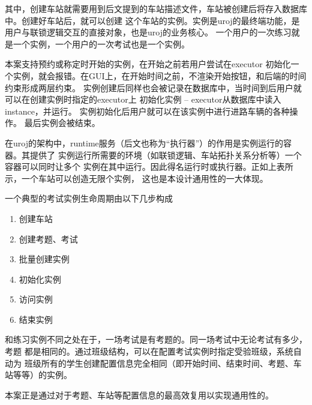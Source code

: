 其中，创建车站就需要用到后文提到的车站描述文件，车站被创建后将存入数据库中。创建好车站后，就可以创建
这个车站的实例。实例是uroj的最终端功能，是用户与联锁逻辑交互的直接对象，也是uroj的业务核心。
一个用户的一次练习就是一个实例，一个用户的一次考试也是一个实例。

本案支持预约或称定时开始的实例，在开始之前若用户尝试在executor
初始化一个实例，就会报错。在GUI上，在开始时间之前，不渲染开始按钮，和后端的时间约束形成两层约束。
实例创建后同样也会被记录在数据库中，当时间到后用户就可以在创建实例时指定的executor上
初始化实例 -- executor从数据库中读入instance，并运行。
实例初始化后用户就可以在该实例中进行进路车辆的各种操作。
最后实例会被结束。

在uroj的架构中，runtime服务（后文也称为“执行器”）的作用是实例运行的容器。其提供了
实例运行所需要的环境（如联锁逻辑、车站拓扑关系分析等）一个容器可以同时让多个
实例在其中运行。因此得名运行时或执行器。正如上表所示，一个车站可以创造无限个实例，
这也是本设计通用性的一大体现。

一个典型的考试实例生命周期由以下几步构成
\begin{enumerate}[\indent i.]
    \item 创建车站
    \item 创建考题、考试
    \item 批量创建实例
    \item 初始化实例
    \item 访问实例
    \item 结束实例
\end{enumerate}

和练习实例不同之处在于，一场考试是有考题的。同一场考试中无论考试有多少，考题
都是相同的。通过班级结构，可以在配置考试实例时指定受验班级，系统自动为
班级所有的学生创建配置信息完全相同（即开始时间、结束时间、考题、车站等等）的实例。

本案正是通过对于考题、车站等配置信息的最高效复用以实现通用性的。